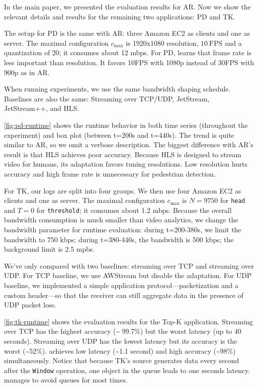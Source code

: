 \documentclass[twocolumn, 9pt]{article}
\begin{document}
In the main paper, we presented the evaluation results for AR. Now we show the
relevant details and results for the remaining two applications: PD and TK.

 The setup for PD is the same with AR: three Amazon
EC2 as clients and one as server. The maximal configuration $c_{\max}$ is
1920x1080 resolution, \(10~\text{FPS}\) and a quantization of 20; it consumes
about 12 mbps. For PD, \sysname{} learns that frame rate is less important than
resolution. It favors 10FPS with 1080p instead of 30FPS with 900p as in AR.

When running experiments, we use the same bandwidth shaping schedule. Baselines
are also the same: Streaming over TCP/UDP, JetStream, JetStream++, and HLS.

\autoref{fig:pd-runtime} shows the runtime behavior in both time series
(throughout the experiment) and box plot (between t=200s and t=440s). The trend
is quite similar to AR, so we omit a verbose description. The biggest difference
with AR's result is that HLS achieves poor accuracy. Because HLS is designed to
stream video for humans, its adaptation favors tuning resolutions. Low
resolution hurts accuracy and high frame rate is unnecessary for pedestrian
detection.

 For TK, our logs are split into four groups. We then use four
Amazon EC2 as clients and one as server. The maximal configuration $c_{\max}$ is
$N=9750$ for \texttt{head} and $T=0$ for \texttt{threshold}; it consumes about
1.2 mbps. Because the overall bandwidth consumption is much smaller than video
analytics, we change the bandwidth parameter for runtime evaluation: during
t=200-380s, we limit the bandwidth to 750 kbps; during t=380-440s, the bandwidth
is 500 kbps; the background limit is 2.5 mpbs.

We've only compared \sysname{} with two baselines: streaming over TCP and
streaming over UDP. For TCP baseline, we use AWStream but disable the
adaptation. For UDP baseline, we implemented a simple application
protocol---packetization and a custom header---so that the receiver can still
aggregate data in the presence of UDP packet loss.

\autoref{fig:tk-runtime} shows the evaluation results for the Top-K
application. Streaming over TCP has the highest accuracy (\textasciitilde
99.7\%) but the worst latency (up to 40 seconds). Streaming over UDP has the
lowest latency but its accuracy is the worst (\textasciitilde 52\%). \sysname{}
achieves low latency (\textasciitilde 1.1 second) and high accuracy
(\textasciitilde 98\%) simultaneously. Notice that because TK's source generates
data every second after the \texttt{Window} operation, one object in the queue
leads to one seconds latency. \sysname{} manages to avoid queues for most times.
\end{document}
